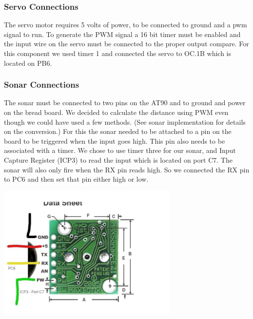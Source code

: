 \subsubsection{Servo Connections}
The servo motor requires 5 volts of power, to be connected to ground and a pwm signal to run. To generate the PWM signal a 16 bit timer must be enabled and the input wire on the servo must be connected to the proper output compare. For this component we used timer 1 and connected the servo to OC.1B which is located on PB6.

\subsubsection{Sonar Connections}
The sonar must be connected to two pins on the AT90 and to ground and power on the bread board. We decided to calculate the distance using PWM even though we could have used a few methods. (See sonar implementation for details on the conversion.)  For this the sonar needed to be attached to a pin on the board to be triggered when the input goes high. This pin also needs to be associated with a timer. We chose to use timer three for our sonar, and Input Capture Register (ICP3) to read the input which is located on port C7. The sonar will also only fire when the RX pin reads high. So we connected the RX pin to PC6 and then set that pin either high or low.

  \begin{minipage}{6.5in}
    \includegraphics[width=90mm]{imageSources/sonarConnect.png}
  \centering
  \label{sonarConnect}
  \end{minipage}


